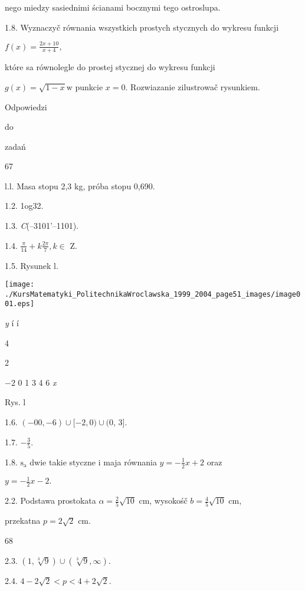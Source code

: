 \documentclass[a4paper,12pt]{article}
\begin{document}
nego miedzy sasiednimi ścianami bocznymi tego ostroslupa.

1.8. Wyznaczyč równania wszystkich prostych stycznych do wykresu funkcji

$f(x)=\displaystyle \frac{2x+10}{x+4},$

które sa równolegle do prostej stycznej do wykresu funkcji

$g(x)=\sqrt{1-x}\mathrm{w}$ punkcie $x=0$. Rozwiazanie zilustrowač rysunkiem.





Odpowiedzi

do

zadań





67

l.l. Masa stopu 2,3 kg, próba stopu 0,690.

1.2. 1og32.

1.3. {\it C}(--3101'--1101).

1.4. $\displaystyle \frac{\pi}{14}+k\frac{2\pi}{7},  k\in$ Z.

1.5. Rysunek l.
\begin{center}
\texttt{[image: ./KursMatematyki\_PolitechnikaWroclawska\_1999\_2004\_page51\_images/image001.eps]}
\end{center}
{\it y}  í í

4

2

$-2$  0 1  3 4  6 {\it x}

Rys. l

1.6. $(- 00,-6)\cup[-2,0)\cup(0$, 3$].$

1.7. $-\displaystyle \frac{3}{5}.$

1.8. $\mathrm{s}_{\mathrm{a}}$ dwie takie styczne $\mathrm{i}$ maja równania $y = -\displaystyle \frac{1}{2}x +2$ oraz

$y=-\displaystyle \frac{1}{2}x-2.$

2.2. Podstawa prostokata $\alpha = \displaystyle \frac{2}{5}\sqrt{10}$ cm, wysokośč $b = \displaystyle \frac{4}{5}\sqrt{10}$ cm,

przekatna $p=2\sqrt{2}$ cm.





68

2.3. $(1,\sqrt[3]{9})\cup(\sqrt[3]{9},\infty).$

2.4. $4-2\sqrt{2}<p<4+2\sqrt{2}.$
\end{document}
